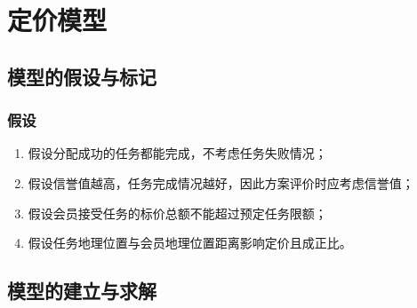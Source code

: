\documentclass{article}
\begin{document}
\fi
\clearpage
\section{定价模型}
\subsection{模型的假设与标记}
\subsubsection{假设}
\begin{enumerate}
	\item 假设分配成功的任务都能完成，不考虑任务失败情况；
	\item 假设信誉值越高，任务完成情况越好，因此方案评价时应考虑信誉值；
	\item 假设会员接受任务的标价总额不能超过预定任务限额；
	\item 假设任务地理位置与会员地理位置距离影响定价且成正比。
\end{enumerate}
\subsection{模型的建立与求解}
\end{document}
